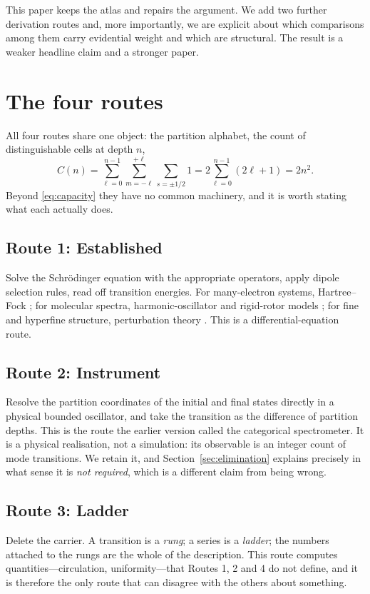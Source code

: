 \documentclass[11pt,a4paper]{article}
\theoremstyle{stmtstyle}
\theoremstyle{definition}
\theoremstyle{remark}
\begin{document}
This paper keeps the atlas and repairs the argument. We add two further
derivation routes and, more importantly, we are explicit about which
comparisons among them carry evidential weight and which are structural.
The result is a weaker headline claim and a stronger paper.

\section{The four routes}
\label{sec:routes}

All four routes share one object: the partition alphabet, the count of
distinguishable cells at depth $n$,
\begin{equation}
C(n)=\sum_{\ell=0}^{n-1}\sum_{m=-\ell}^{+\ell}\sum_{s=\pm 1/2}1
     =2\sum_{\ell=0}^{n-1}(2\ell+1)=2n^{2}.
\label{eq:capacity}
\end{equation}
Beyond \eqref{eq:capacity} they have no common machinery, and it is worth
stating what each actually does.

\subsection*{Route 1: Established}
Solve the Schr\"odinger equation with the appropriate operators, apply
dipole selection rules, read off transition energies. For many-electron
systems, Hartree--Fock \citep{hartree1928,fock1930}; for molecular spectra,
harmonic-oscillator and rigid-rotor models \citep{wilsondeciuscross1955};
for fine and hyperfine structure, perturbation theory
\citep{griffiths2018}. This is a differential-equation route.

\subsection*{Route 2: Instrument}
Resolve the partition coordinates of the initial and final states directly
in a physical bounded oscillator, and take the transition as the difference
of partition depths. This is the route the earlier version called the
categorical spectrometer. It is a physical realisation, not a simulation:
its observable is an integer count of mode transitions. We retain it, and
Section~\ref{sec:elimination} explains precisely in what sense it is
\emph{not required}, which is a different claim from being wrong.

\subsection*{Route 3: Ladder}
Delete the carrier. A transition is a \emph{rung}; a series is a
\emph{ladder}; the numbers attached to the rungs are the whole of the
description. This route computes quantities---circulation, uniformity---that
Routes 1, 2 and 4 do not define, and it is therefore the only route that can
disagree with the others about something.
\end{document}

